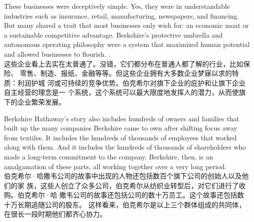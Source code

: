 \begin{verseparallel}
  {
    These businesses were deceptively simple. Yes, they were in understandable
    industries such as insurance, retail, manufacturing, newspapers, and
    financing. But many shared a trait that most businesses only wish for: an
    economic moat or a sustainable competitive advantage. Berkshire's protective
    umbrella and autonomous operating philosophy were a system that maximized
    human potential and allowed businesses to flourish. . \\
  }
  {
    这些企业看上去实在太普通了。没错，它们都分布在普通人都了解的行业，比如保险、
    零售、制造、报纸、金融等等。但这些企业拥有大多数企业梦寐以求的特质：利润护城
    河或可持续的竞争优势。伯克希尔对旗下企业的庇护和让旗下企业自主经营的理念是一
    个系统，这个系统可以最大限度地发挥人的潜力，从而使旗下的企业繁荣发展。
  }
\end{verseparallel}

\begin{verseparallel}
  {
    Berkshire Hathaway's story also includes hundreds of owners and families
    that built up the many companies Berkshire came to own after shifting focus
    away from textiles. It includes the hundreds of thousands of employees that
    worked along with them. And it includes the hundreds of thousands of
    shareholders who made a long-term commitment to the company. Berkshire,
    then, is an amalgamation of these parts, all working together over a very
    long period. \\
  }
  {
    伯克希尔·哈撒韦公司的故事中出现的人物还包括数百个旗下公司的创始人以及他们的家
    族，这些人创立了众多公司，伯克希尔从纺织业转型后，对它们进行了收购。伯克希尔·哈
    撒韦公司的故事还包括公司的数十万员工。这个故事还包括数十万长期追随公司的股东。
    这样看来，伯克希尔是以上三个群体组成的共同体，在很长一段时期他们都齐心协力。
  }
\end{verseparallel}

